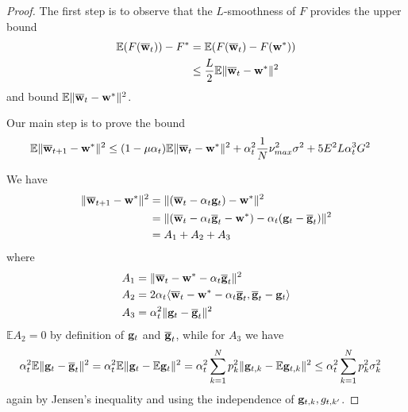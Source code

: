 \begin{proof}
	The first step is to observe that the $L$-smoothness of $F$ provides
	the upper bound
	\begin{align*}
	\mathbb{E}(F({\overline{\mathbf{w}}}_{t}))-F^{\ast} & =\mathbb{E}(F({\overline{\mathbf{w}}}_{t})-F({\mathbf{w}}^{\ast}))\\
	& \leq\frac{L}{2}\mathbb{E}\|{\overline{\mathbf{w}}}_{t}-{\mathbf{w}}^{\ast}\|^{2}
	\end{align*}
	and bound $\mathbb{E}\|{\overline{\mathbf{w}}}_{t}-{\mathbf{w}}^{\ast}\|^{2}$. 
	
	Our main step is to prove the bound 
	\begin{align*}
	\mathbb{E}\|{\overline{\mathbf{w}}}_{t+1}-{\mathbf{w}}^{\ast}\|^{2} & \leq(1-\mu\alpha_{t})\mathbb{E}\|{\overline{\mathbf{w}}}_{t}-{\mathbf{w}}^{\ast}\|^{2}+\alpha_{t}^{2}\frac{1}{N}\nu_{max}^{2}\sigma^{2}+5E^{2}L\alpha_{t}^{3}G^{2}
	\end{align*}
	
	We have 
	\begin{align*}
	\|{\overline{\mathbf{w}}}_{t+1}-{\mathbf{w}}^{\ast}\|^{2} & =\|({\overline{\mathbf{w}}}_{t}-\alpha_{t}{\mathbf{g}}_{t})-{\mathbf{w}}^{\ast}\|^{2}\\
	& =\|({\overline{\mathbf{w}}}_{t}-\alpha_{t}{\overline{\mathbf{g}}}_{t}-{\mathbf{w}}^{\ast})-\alpha_{t}({\mathbf{g}}_{t}-{\overline{\mathbf{g}}}_{t})\|^{2}\\
	& =A_{1}+A_{2}+A_{3}
	\end{align*}
	where 
	\begin{align*}
	A_{1} & =\|{\overline{\mathbf{w}}}_{t}-{\mathbf{w}}^{\ast}-\alpha_{t}{\overline{\mathbf{g}}}_{t}\|^{2}\\
	A_{2} & =2\alpha_{t}\langle{\overline{\mathbf{w}}}_{t}-{\mathbf{w}}^{\ast}-\alpha_{t}{\overline{\mathbf{g}}}_{t},{\overline{\mathbf{g}}}_{t}-{\mathbf{g}}_{t}\rangle\\
	A_{3} & =\alpha_{t}^{2}\|{\mathbf{g}}_{t}-{\overline{\mathbf{g}}}_{t}\|^{2}
	\end{align*}
	$\mathbb{E}A_{2}=0$ by definition of ${\mathbf{g}}_{t}$ and ${\overline{\mathbf{g}}}_{t}$,
	while for $A_{3}$ we have
	\begin{align*}
	\alpha_{t}^{2}\mathbb{E}\|{\mathbf{g}}_{t}-{\overline{\mathbf{g}}}_{t}\|^{2} & =\alpha_{t}^{2}\mathbb{E}\|{\mathbf{g}}_{t}-\mathbb{E}{\mathbf{g}}_{t}\|^{2}=\alpha_{t}^{2}\sum_{k=1}^{N}p_{k}^{2}\|{\mathbf{g}}_{t,k}-\mathbb{E}{\mathbf{g}}_{t,k}\|^{2}\leq\alpha_{t}^{2}\sum_{k=1}^{N}p_{k}^{2}\sigma_{k}^{2}
	\end{align*}
	again by Jensen's inequality and using the independence of ${\mathbf{g}}_{t,k},g_{t,k'}$. 
	

\end{proof}
